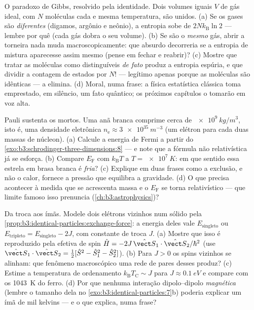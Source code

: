 \begin{exercise}[$\star\star\star$]\label{exo:b3:identical-particles:10}
O paradoxo de Gibbs, resolvido pela identidade. Dois volumes iguais $V$
de gás ideal, com $N$ moléculas cada e mesma temperatura, são unidos.
(a) Se os gases são \emph{diferentes} (digamos, argônio e neônio), a
entropia sobe de $2Nk_{\text{B}}\ln2$ --- lembre por quê (cada gás
dobra o seu volume). (b) Se são o \emph{mesmo} gás, abrir a torneira
nada muda macroscopicamente: que absurdo decorreria se a entropia de
mistura aparecesse assim mesmo (pense em fechar e reabrir)? (c) Mostre
que tratar as moléculas como distinguíveis \emph{de fato} produz a
entropia espúria, e que dividir a contagem de estados por $N!$ ---
legítimo apenas porque as moléculas são idênticas --- a elimina. (d)
Moral, numa frase: a física estatística clássica toma emprestado, em
silêncio, um fato quântico; os próximos capítulos o tomarão em voz
alta.
\end{exercise}

\begin{exercise}[$\star\star\star$]\label{exo:b3:identical-particles:11}
Pauli sustenta os mortos. Uma anã branca comprime cerca de
$\qty{e9}{kg/m^3}$, isto é, uma densidade eletrônica $n_{\text{e}} \approx
\qty{3e35}{m^{-3}}$ (um elétron para cada duas
massas de núcleon). (a) Calcule a energia de Fermi a partir do
\cref{exo:b3:schrodinger-three-dimensions:8}
--- e note que a fórmula não relativística já se esforça. (b) Compare
$E_{\text{F}}$ com $k_{\text{B}}T$ a $T = \qty{e7}{K}$: em que sentido
essa estrela em brasa branca é \emph{fria}? (c) Explique em duas frases
como a exclusão, e não o calor, fornece a pressão que equilibra a
gravidade. (d) O que precisa acontecer à medida que se acrescenta massa
e o $E_{\text{F}}$ se torna relativístico --- que limite famoso isso
prenuncia (\cref{ch:b3:astrophysics})?
\end{exercise}

\begin{exercise}[$\star\star\star$]\label{exo:b3:identical-particles:12}
Da troca aos ímãs. Modele dois elétrons vizinhos num sólido pela
\cref{prop:b3:identical-particles:exchange-force}: a energia deles vale
$E_{\text{singleto}}$ ou $E_{\text{tripleto}} =
E_{\text{singleto}} - 2J$, com constante de troca $J$. (a) Mostre que
isso é reproduzido pela  efetiva de spin $\hat H =
-2J\,\hat{\vect S}_1\cdot\hat{\vect S}_2/\hbar^2$ (use
$\hat{\vect S}_1\cdot\hat{\vect S}_2 = \tfrac12[\hat S^2 - \hat
S_1^2 - \hat S_2^2]$). (b) Para $J > 0$ os spins vizinhos se alinham:
que fenômeno macroscópico uma rede de pares desses produz? (c) Estime a
temperatura de ordenamento $k_{\text{B}}T_{\text{C}}
\sim J$ para $J \approx \qty{0.1}{eV}$ e compare com os \qty{1043}{K}
do ferro. (d) Por que nenhuma interação dipolo--dipolo \emph{magnética}
(lembre o tamanho dela no
\cref{exo:b3:identical-particles:7}b) poderia explicar um ímã de mil
kelvins --- e o que explica, numa frase?
\end{exercise}

